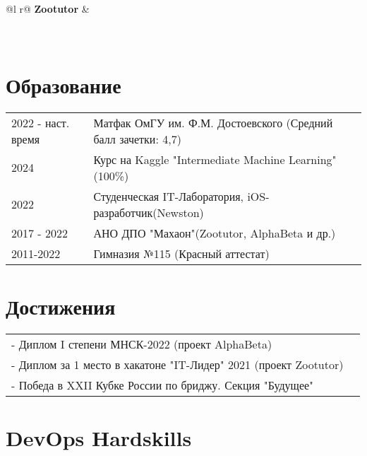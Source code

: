 \documentclass[a4paper,12pt]{article}
\begin{document}
\begin{tabularx}{\linewidth}{ @{}l r@{} }
{\textbf{Zootutor}} & \hfill \\[3.75pt]
 \\\\
\end{tabularx}

\section{Образование}
\begin{tabularx}{\linewidth}{@{}l X@{}}	
2022 - наст. время & Матфак ОмГУ им. Ф.М. Достоевского \hfill \normalsize (Средний балл зачетки: 4,7) \\
2024 & Курс на Kaggle "Intermediate Machine Learning"\hfill (100\%)\\
2022 & Студенческая IT-Лаборатория, iOS-разработчик\hfill (Newston)\\
2017 - 2022 & АНО ДПО "Махаон"\hfill(Zootutor, AlphaBeta и др.) \\ 
2011-2022 & Гимназия №115 \hfill  (Красный аттестат) \\
\end{tabularx}

\section{Достижения}
\begin{tabularx}{\linewidth}{@{}l X@{}}	
- Диплом I степени МНСК-2022 (проект AlphaBeta) \hfill \normalsize  \\
- Диплом за 1 место в хакатоне "IT-Лидер" 2021 (проект Zootutor)\\
- Победа в XXII Кубке России по бриджу. Секция "Будущее" \hfill  \\
\end{tabularx}
\section{DevOps Hardskills}
\end{document}
